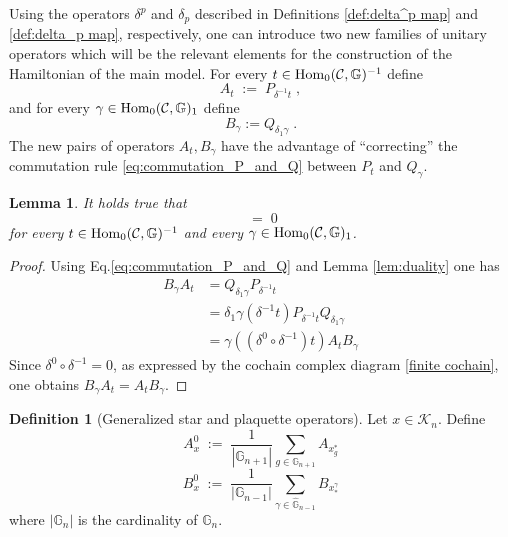 \documentclass[a4paper,12pt,twoside,reqno]{amsart}
\theoremstyle{plain}
\newtheorem{lemma}[teo]{Lemma}
\theoremstyle{definition}
\newtheorem{definition}[teo]{Definition}
\theoremstyle{remark}
\numberwithin{equation}{section}
\numberwithin{figure}{section}
\numberwithin{table}{section}
\newcommand{\f}[1]{\mathcal{#1}}
\newcommand{\n}[1]{\mathbb{#1}}
\newcommand{\ab}[1]{\left| #1 \right|}
\begin{document}
	Using the operators $\delta^p$ and $\delta_p$ described in Definitions \ref{def:delta^p map} and \ref{def:delta_p map}, respectively, one can introduce two new families of unitary operators which will be the relevant elements for the construction of the Hamiltonian of the main model.
	For every $t\in {\rm Hom}_0(\f{C},\n{G})^{-1}$ define
	\begin{equation*}
		A_t\;:=\;P_{\delta^{-1}t}\;,
	\end{equation*}
	and for every $\gamma\in {\rm Hom}_0(\f{C},\n{G})_1$ define 
	\begin{equation*}
		B_\gamma:=Q_{\delta_1 \gamma}\;.
	\end{equation*}
	The new pairs of operators  $A_t,B_\gamma$ have the advantage of ``correcting'' the commutation rule \eqref{eq:commutation_P_and_Q} between $P_t$ and $Q_\gamma$.
	\begin{lemma}\label{lem:commut_AB}
		It holds true that
		\begin{equation*}
			[A_t,B_\gamma]\;=\;0
		\end{equation*}
		for every $t\in {\rm Hom}_0(\f{C},\n{G})^{-1}$ and every $\gamma\in {\rm Hom}_0(\f{C},\n{G})_1$.
	\end{lemma}
	
	
	
	
	
	
	
	
	
	
	
	\begin{proof}
		Using Eq.\eqref{eq:commutation_P_and_Q} and Lemma \ref{lem:duality} one has
		\begin{align*}
			B_\gamma A_t&=Q_{\delta_1\gamma}P_{\delta^{-1}t}\\
			&=\delta_1\gamma(\delta^{-1}t)P_{\delta^{-1}t}Q_{\delta_1\gamma}\\
			&=\gamma((\delta^0\circ \delta^{-1}) t) A_t B_\gamma
		\end{align*}
		Since $\delta^0\circ\delta^{-1}=0$, as expressed by  the cochain complex diagram \eqref{finite cochain}, one obtains $B_\gamma A_t=A_tB_\gamma$.
	\end{proof}
	
	
	
	
	
	
	
	\begin{definition}[Generalized star and plaquette operators]
		\label{def:local_operators}	Let $x\in \f{K}_n$. Define
		\begin{equation*}
			A_x^0\;:=\;\frac{1}{\ab{\n{G}_{n+1}}} \sum_{g\in \n{G}_{n+1}} A_{x^*_g}
		\end{equation*}
		\begin{equation*}
			B_x^0\;:=\;\frac{1}{\ab{\n{G}_{n-1}}}\sum_{\gamma\in \widehat{\n{G}}_{n-1}} B_{ x_*^\gamma}
		\end{equation*}
		where $|\n{G}_{n}|$ is the cardinality of $\n{G}_{n}$.
	\end{definition}
	
\end{document}
